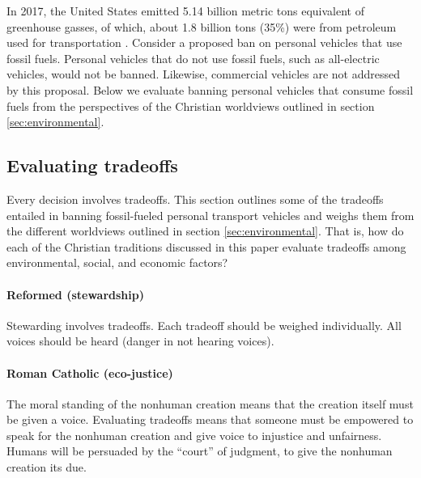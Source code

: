 \documentclass[12pt]{article}
\begin{document}
In 2017, the United States emitted 5.14 billion metric tons equivalent of greenhouse gasses, of which, 
about 1.8 billion tons (35\%) were from petroleum used for transportation \cite{EIA2017}.
Consider a proposed ban on personal vehicles that use fossil fuels.
Personal vehicles that do not use fossil fuels, such as all-electric vehicles, would not be banned. 
Likewise, commercial vehicles are not addressed by this proposal. %
Below we evaluate banning personal vehicles that consume fossil fuels from the perspectives of the Christian worldviews outlined in section \ref{sec:environmental}.


\subsection{Evaluating tradeoffs}
\label{sec:evaluating_tradeoffs}
Every decision involves tradeoffs. This section outlines some of the tradeoffs entailed in banning fossil-fueled personal transport vehicles 
and weighs them from the different worldviews outlined in section \ref{sec:environmental}.
That is, how do each of the Christian traditions discussed in this paper 
evaluate tradeoffs among environmental, social, and economic factors?

\paragraph{Reformed (stewardship)} 

Stewarding involves tradeoffs.  %
Each tradeoff should be weighed individually. %
All voices should be heard (danger in not hearing voices). %

\paragraph{Roman Catholic (eco-justice)} 

The moral standing of the nonhuman creation means that 
the creation itself must be given a voice. 
Evaluating tradeoffs means that someone must be empowered 
to speak for the nonhuman creation and 
give voice to injustice and unfairness. 
Humans will be persuaded by the “court” of judgment, 
to give the nonhuman creation its due.
\end{document}
